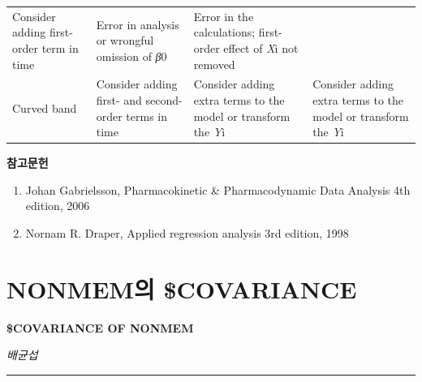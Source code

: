 \documentclass[
  10pt,
]{krantz}
\renewenvironment{quote}{\begin{VF}}{\end{VF}}
\begin{document}
\begin{longtable}[]{@{}llll@{}}
\begin{minipage}[t]{0.20\columnwidth}
Consider adding first-order term in time\strut
\end{minipage} & \begin{minipage}[t]{0.27\columnwidth}\raggedright
Error in analysis or wrongful omission of \emph{β}0\strut
\end{minipage} & \begin{minipage}[t]{0.28\columnwidth}\raggedright
Error in the calculations; first-order effect of \emph{X}i not removed\strut
\end{minipage}\tabularnewline
\begin{minipage}[t]{0.14\columnwidth}\raggedright
Curved band\strut
\end{minipage} & \begin{minipage}[t]{0.20\columnwidth}\raggedright
Consider adding first- and second- order terms in time\strut
\end{minipage} & \begin{minipage}[t]{0.27\columnwidth}\raggedright
Consider adding extra terms to the model or transform the \emph{Y}i\strut
\end{minipage} & \begin{minipage}[t]{0.28\columnwidth}\raggedright
Consider adding extra terms to the model or transform the \emph{Y}i\strut
\end{minipage}\tabularnewline
\bottomrule
\end{longtable}

\textbf{참고문헌}

\begin{enumerate}
\def\labelenumi{\arabic{enumi}.}
\item
  \begin{quote}
  Johan Gabrielsson, Pharmacokinetic \& Pharmacodynamic Data Analysis
  4th edition, 2006
  \end{quote}
\item
  \begin{quote}
  Nornam R. Draper, Applied regression analysis 3rd
  edition, 1998
  \end{quote}
\end{enumerate}

\hypertarget{cov}{%
\chapter{NONMEM의 \$COVARIANCE}\label{cov}}

\textbf{\$COVARIANCE OF NONMEM}

\emph{배균섭}

\begin{center}\rule{0.5\linewidth}{0.5pt}\end{center}
\end{document}
